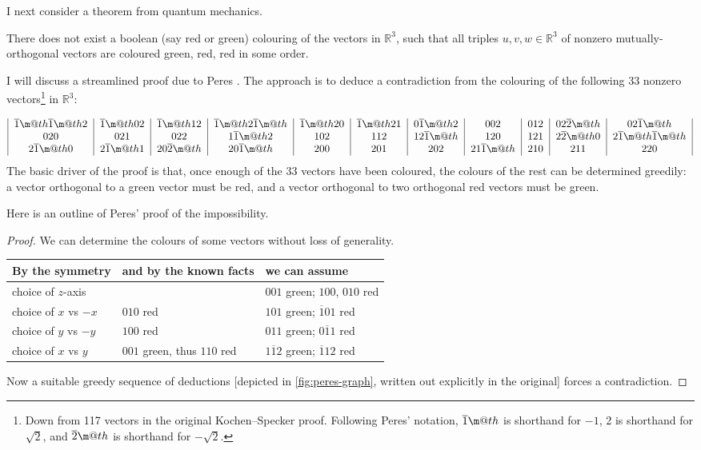 \documentclass[runningheads]{llncs}
\makeatletter
\newcommand*{\textoverline}[1]{$\overline{\hbox{#1}}\m@th$}
\makeatother
\begin{document}
I next consider
a theorem from quantum mechanics.
\begin{theorem}
  There does not exist a boolean (say red or green) colouring of the vectors in $\mathbb{R}^3$,
  such that all triples $u,v,w\in \mathbb{R}^3$ of nonzero mutually-orthogonal vectors
  are coloured green, red, red in some order.
\end{theorem}

I will discuss a streamlined proof due to Peres \cite{Per91}.
The approach is to deduce a contradiction from the colouring of the following 33
  nonzero vectors\footnote{
      Down from 117 vectors in the original Kochen--Specker proof.
        Following Peres' notation, \textoverline{1} is shorthand for $-1$, 2 is shorthand for $\sqrt{2}$, and \textoverline{2} is
shorthand for $-\sqrt{2}$.
  } in
$\mathbb{R}^3$:

\begin{align}
  \begin{tabular}{|c|c|c|c|c|c|c|c|c|c|c|}
  \textoverline{1}\textoverline{1}2 & \textoverline{1}02 &
  \textoverline{1}12 & \textoverline{1}2\textoverline{1} &
  \textoverline{1}20 & \textoverline{1}21 &
  0\textoverline{1}2 & 002 &
  012 & 02\textoverline{2} &
  02\textoverline{1} \\ 020 &
  021 & 022 &
  1\textoverline{1}2 & 102 &
  112 & 12\textoverline{1} &
  120 & 121 &
  2\textoverline{2}0 & 2\textoverline{1}\textoverline{1} \\
  2\textoverline{1}0 & 2\textoverline{1}1 &
  20\textoverline{2} & 20\textoverline{1} &
  200 & 201 &
  202 & 21\textoverline{1} &
  210 & 211 &
  220
\end{tabular}\label{KS-witnesses}
\end{align}
The basic driver of the proof is that,
once enough of the 33 vectors have been coloured,
the colours of the rest can be determined greedily:
a vector orthogonal to a green vector must be red,
and a vector orthogonal to two orthogonal red vectors must be green.

Here is an outline of Peres' proof \cite{Per91} of the impossibility.
\begin{proof}
  We can determine the colours of some vectors without loss of generality.
  
{\footnotesize
  \begin{tabular}{l|l|l}
  By the symmetry
  & and by the known facts
  & we can assume\\
  \hline
  choice of $z$-axis 
  && $001$ green;  $100$, $010$ red\\
  choice of $x$ vs $-x$ 
  &$010$ red
  & $101$ green; $\overline{1}01$ red\\
  choice of $y$ vs $-y$ 
  &$100$ red
  & $011$ green; $0\overline{1}1$ red\\
  choice of $x$ vs $y$ 
  &$001$ green, thus $110$ red
  & $1\overline{1}2$ green; $\overline{1}12$ red
\end{tabular}}

Now a suitable greedy sequence of deductions 
[depicted in \cref{fig:peres-graph},
written out explicitly in the original]
forces a contradiction.
\end{proof}
\end{document}
